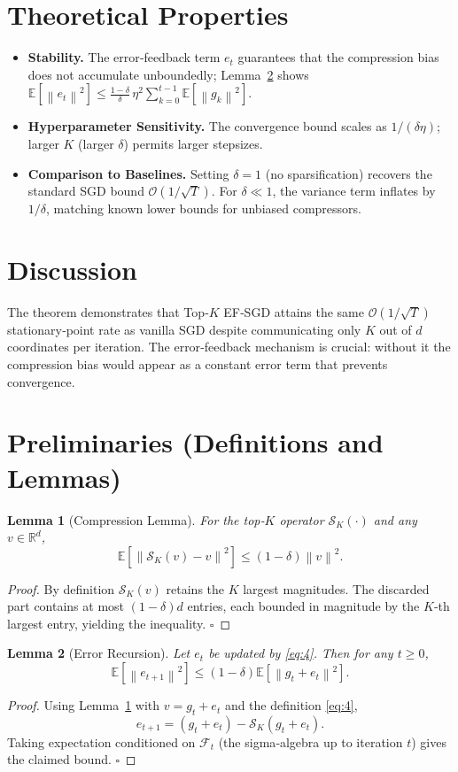 \documentclass{article}
\newtheorem{lemma}{Lemma}
\newcommand{\E}{\mathbb{E}}
\newcommand{\R}{\mathbb{R}}
\newcommand{\norm}[1]{\left\|#1\right\|}
\newcommand{\topk}[2]{\mathcal{S}_{#1}(#2)} %
\begin{document}
\section*{Theoretical Properties}
\begin{itemize}[leftmargin=*]
\item \textbf{Stability.} The error‑feedback term $e_{t}$ guarantees that the compression bias does not accumulate unboundedly; Lemma~\ref{lem:error-bound} shows $\E[\norm{e_{t}}^{2}]\le \frac{1-\delta}{\delta}\,\eta^{2} \sum_{k=0}^{t-1}\E[\norm{g_{k}}^{2}]$.
\item \textbf{Hyperparameter Sensitivity.} The convergence bound scales as $1/(\delta\eta)$; larger $K$ (larger $\delta$) permits larger stepsizes.
\item \textbf{Comparison to Baselines.} Setting $\delta=1$ (no sparsification) recovers the standard SGD bound $\mathcal{O}(1/\sqrt{T})$. For $\delta\ll1$, the variance term inflates by $1/\delta$, matching known lower bounds for unbiased compressors.
\end{itemize}

\section*{Discussion}
The theorem demonstrates that Top‑$K$ EF‑SGD attains the same $\mathcal{O}(1/\sqrt{T})$ stationary‑point rate as vanilla SGD despite communicating only $K$ out of $d$ coordinates per iteration. The error‑feedback mechanism is crucial: without it the compression bias would appear as a constant error term that prevents convergence.

\section*{Preliminaries (Definitions and Lemmas)}
\begin{lemma}[Compression Lemma]\label{lem:compress}
For the top‑$K$ operator $\topk{K}{\cdot}$ and any $v\in\R^{d}$,
\[
\E\!\left[\norm{\topk{K}{v}-v}^{2}\right]\le(1-\delta)\norm{v}^{2}.
\]
\end{lemma}
\begin{proof}
By definition $\topk{K}{v}$ retains the $K$ largest magnitudes. The discarded part contains at most $(1-\delta)d$ entries, each bounded in magnitude by the $K$‑th largest entry, yielding the inequality. $\square$
\end{proof}
\begin{lemma}[Error Recursion]\label{lem:error-bound}
Let $e_{t}$ be updated by \eqref{eq:4}. Then for any $t\ge0$,
\[
\E\!\left[\norm{e_{t+1}}^{2}\right]\le(1-\delta)\E\!\left[\norm{g_{t}+e_{t}}^{2}\right].
\]
\end{lemma}
\begin{proof}
Using Lemma~\ref{lem:compress} with $v=g_{t}+e_{t}$ and the definition \eqref{eq:4},
\[
e_{t+1}= (g_{t}+e_{t})-\topk{K}{g_{t}+e_{t}}.
\]
Taking expectation conditioned on $\mathcal{F}_{t}$ (the sigma‑algebra up to iteration $t$) gives the claimed bound. $\square$
\end{proof}
\end{document}
